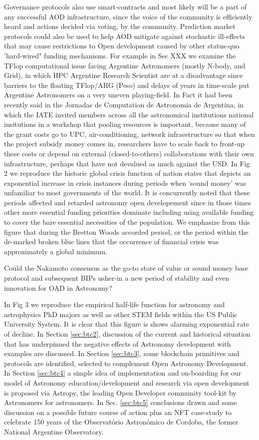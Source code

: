 \documentclass[final,5p,times,twocolumn,authoryear]{elsarticle}
\begin{document}
Governance protocols also use smart-contracts and most likely will be a part of any successful AOD infrastructure, since the voice of the community is efficiently heard and actions decided via voting, by the community. Prediction market protocols could also be used to help AOD mitigate against stochastic ill-effects that may cause restrictions to Open development caused by other status-quo 'hard-wired" funding mechanisms. For example in Sec XXX we examine the TFlop computational issue facing Argentine Astronomers (mostly N-body, and Grid), in which HPC Argentine Research Scientist are at a disadvantage since barriers to the floating TFlop/ARG (Peso) and delays of years in time-scale put Argentine Astronomers on a very uneven playing-field. In Fact it had been recently said in the Jornadas de Computation de Astronomia de Argentina, in which the IATE invited members across all the astronomical institutions national insitutions in a workshop that pooling resources is important, because many of the grant costs go to UPC, air-conditioning, network infraestructure so that when the project subsidy money comes in, researchers have to scale back to front-up these costs or depend on external (closed-to-others) collaborations with their own infrastructure, perhaps that have not devalued as much against the USD. In Fig 2 we reproduce the historic global crisis function of nation states that depicts an exponential increase in crisis instances during periods when `sound money' was  unfamiliar to most governments of the world. It is concurrently noted that these periods affected and retarded astronomy open developement since in those times other more essential funding priorities dominate including using available funding to cover the bare essential necessities of the population. We emphasize from this figure that during the Bretton Woods accorded period, or the period within the de-marked broken blue lines that the occurrence of financial crisis was approximately a global minimum. 

Could the Nakamoto consensus as the go-to store of value or sound money base protocol and subsequent BIPs usher-in a new period of stability and even innovation for OAD in Astronomy? 

In Fig 3 we reproduce the empirical half-life function for astronomy and astrophysics PhD majors as well as other STEM fields within the US Public University System. It is clear that this figure is shows alarming exponential rate of decline.  In Section \ref{sec:btc2}, discussion of the current and historical situation that has underpinned the negative effects of Astronomy development with examples are discussed. In Section  \ref{sec:btc3}, some blockchain primitives and protocols are identified, selected to complement Open Astronomy Development.  In Section \ref{sec:btc4} a simple idea of implementation and on-boarding for our model of Astronomy education/development and research via open development is proposed via Astropy, the leading Open Developer community tool-kit by Astronomers for astronomers. In Sec. \ref{sec:btc5} conclusions drawn and some discussion on a possible future course of action plus an NFT case-study to celebrate 150 years of the Observat\'orio Astron\'omico de Cordoba, the former National Argentine Observatory. 
\end{document}
